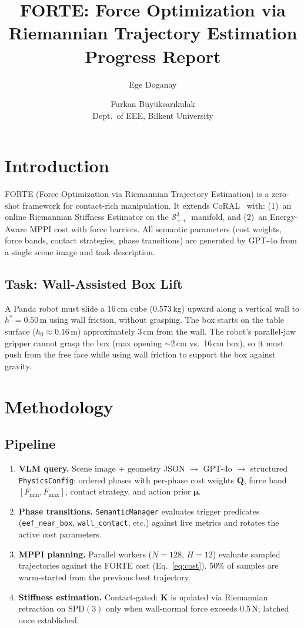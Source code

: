 \documentclass[10pt,twocolumn]{article}
\title{FORTE: Force Optimization via Riemannian Trajectory Estimation\\
\large Progress Report}
\author{Ege Doganay \and Furkan B\"{u}y\"{u}ksar{\i}kulak \\
\small Dept.\ of EEE, Bilkent University}
\date{}
\begin{document}
\maketitle

\section{Introduction}

FORTE (Force Optimization via Riemannian Trajectory Estimation) is a zero-shot framework for contact-rich manipulation. It extends CoRAL~\cite{coral} with: (1)~an online Riemannian Stiffness Estimator on the $\mathcal{S}^3_{++}$ manifold, and (2)~an Energy-Aware MPPI cost with force barriers. All semantic parameters (cost weights, force bands, contact strategies, phase transitions) are generated by GPT-4o from a single scene image and task description.

\subsection{Task: Wall-Assisted Box Lift}

A Panda robot must slide a 16\,cm cube (0.573\,kg) upward along a vertical wall to $h^* = 0.50$\,m using wall friction, without grasping. The box starts on the table surface ($h_0 \approx 0.16$\,m) approximately 3\,cm from the wall. The robot's parallel-jaw gripper cannot grasp the box (max opening $\sim$2\,cm vs.\ 16\,cm box), so it must push from the free face while using wall friction to support the box against gravity.
\section{Methodology}

\subsection{Pipeline}

\begin{enumerate}
\item \textbf{VLM query.} Scene image $+$ geometry JSON $\to$ GPT-4o $\to$ structured \texttt{PhysicsConfig}: ordered phases with per-phase cost weights $\mathbf{Q}$, force band $[F_{\min},F_{\max}]$, contact strategy, and action prior $\boldsymbol{\mu}$.
\item \textbf{Phase transitions.} \texttt{SemanticManager} evaluates trigger predicates (\texttt{eef\_near\_box}, \texttt{wall\_contact}, etc.) against live metrics and rotates the active cost parameters.
\item \textbf{MPPI planning.} Parallel workers ($N{=}128$, $H{=}12$) evaluate sampled trajectories against the FORTE cost (Eq.~\ref{eq:cost}). 50\% of samples are warm-started from the previous best trajectory.
\item \textbf{Stiffness estimation.} Contact-gated: $\mathbf{K}$ is updated via Riemannian retraction on $\mathrm{SPD}(3)$ only when wall-normal force exceeds 0.5\,N; latched once established.
\end{enumerate}
\end{document}

